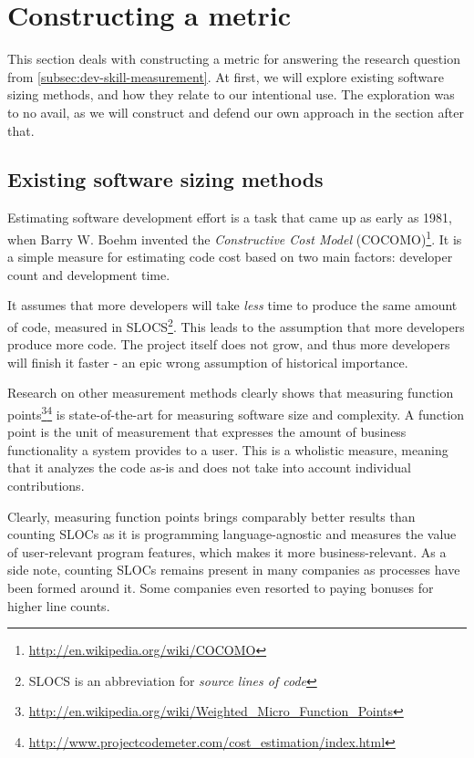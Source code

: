 \section{Constructing a metric}
This section deals with constructing a metric for answering
the research question from \ref{subsec:dev-skill-measurement}.
At first, we will explore existing software sizing methods,
and how they relate to our intentional use.
The exploration was to no avail, as we will construct and defend
our own approach in the section after that.

\subsection{Existing software sizing methods}
Estimating software development effort is a task that
came up as early as 1981, when Barry W. Boehm invented the \textit{
Constructive Cost Model} (COCOMO)\footnote{\url{http://en.wikipedia.org/wiki/COCOMO}}.
It is a simple measure for estimating code cost
based on two main factors: developer count and development time.
\newline

It assumes that more developers will take \textit{less} time to produce the
same amount of code, measured in SLOCS\footnote{SLOCS is an abbreviation for
\textit{source lines of code}}.
This leads to the assumption that more developers produce more code.
The project itself does not grow, and thus more developers will finish it faster -
an epic wrong assumption of historical importance\cite{fb:1975}.
\newline

Research on other measurement methods clearly shows that measuring
function points\footnote{\url{http://en.wikipedia.org/wiki/Weighted_Micro_Function_Points}}\footnote{\url{http://www.projectcodemeter.com/cost_estimation/index.html}}
is state-of-the-art for measuring software size and complexity.\cite{linkedin:functionpointstandard}
A function point is the unit of measurement that expresses the amount of
business functionality a system provides to a user. This is a wholistic
measure, meaning that it analyzes the code as-is and does not take into
account individual contributions.

Clearly, measuring function points brings comparably better results
than counting SLOCs as it is programming language-agnostic and measures
the value of user-relevant program features, which makes it more
business-relevant. As a side note, counting SLOCs remains present in many
companies as processes have been formed around it. Some companies even resorted
to paying bonuses for higher line counts\cite{am:2009}.
\newline

